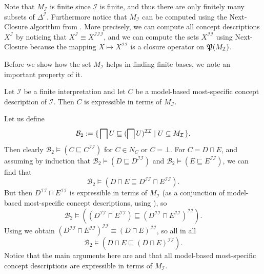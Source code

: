 Note that $M_{\mathcal{I}}$ is finite since $\mathcal{I}$ is finite, and thus there are
only finitely many subsets of $\Delta^{\mathcal{I}}$.  Furthermore notice that
$M_{\mathcal{I}}$ can be computed using the Next-Closure algorithm from
.  More precisely, we can compute all concept descriptions
$X^{\mathcal{I}}$ by noticing that $X^{\mathcal{I}} \equiv
X^{\mathcal{I}\mathcal{I}\mathcal{I}}$, and we can compute the sets
$X^{\mathcal{I}\mathcal{I}}$ using Next-Closure because the mapping $X \mapsto
X^{\mathcal{I}\mathcal{I}}$ is a closure operator on ${\mathfrak{P}(M_{\mathcal{I}})}$.

Before we show how the set $M_{\mathcal{I}}$ helps in finding finite bases, we note an
important property of it.

\begin{Lemma}
  \label{lem:mmsc-are-expressible-in-terms-of-M_I}
  Let $\mathcal{I}$ be a finite interpretation and let $C$ be a model-based most-specific
  concept description of $\mathcal{I}$.  Then $C$ is expressible in terms of
  $M_{\mathcal{I}}$.
\end{Lemma}

Let us define
\begin{equation}
  \label{eq:26}
  \mathcal{B}_2 := {\{\, \bigsqcap U \sqsubseteq (\bigsqcap U)^{\mathcal{I}\mathcal{I}}
    \mid U \subseteq M_{\mathcal{I}} \,\}}.
\end{equation}
Then clearly $\mathcal{B}_2 \models (C \sqsubseteq C^{\mathcal{I}\mathcal{I}})$ for $C \in
N_C$ or $C = \bot$.  For $C = D \sqcap E$, and assuming by induction that $\mathcal{B}_2
\models (D \sqsubseteq D^{\mathcal{I}\mathcal{I}})$ and $\mathcal{B}_2 \models (E
\sqsubseteq E^{\mathcal{I}\mathcal{I}})$, we can find that
\begin{equation*}
  \mathcal{B}_2 \models (D \sqcap E \sqsubseteq D^{\mathcal{I}\mathcal{I}} \sqcap E^{\mathcal{I}\mathcal{I}}).
\end{equation*}
But then $D^{\mathcal{I}\mathcal{I}} \sqcap E^{\mathcal{I}\mathcal{I}}$ is expressible in
terms of $M_{\mathcal{I}}$ (as a conjunction of model-based most-specific concept
descriptions, using ), so
\begin{equation*}
  \mathcal{B}_2 \models ((D^{\mathcal{I}\mathcal{I}} \sqcap E^{\mathcal{I}\mathcal{I}})
  \sqsubseteq (D^{\mathcal{I}\mathcal{I}} \sqcap E^{\mathcal{I}\mathcal{I}})^{\mathcal{I}\mathcal{I}}).
\end{equation*}
Using  we obtain $(D^{\mathcal{I}\mathcal{I}} \sqcap
E^{\mathcal{I}\mathcal{I}})^{\mathcal{I}\mathcal{I}} \equiv (D \sqcap
E)^{\mathcal{I}\mathcal{I}}$, so all in all
\begin{equation*}
  \mathcal{B}_2 \models (D \sqcap E \sqsubseteq (D \sqcap E)^{\mathcal{I}\mathcal{I}}).
\end{equation*}
Notice that the main arguments here are  and that all
model-based most-specific concept descriptions are expressible in terms of
$M_{\mathcal{I}}$.

